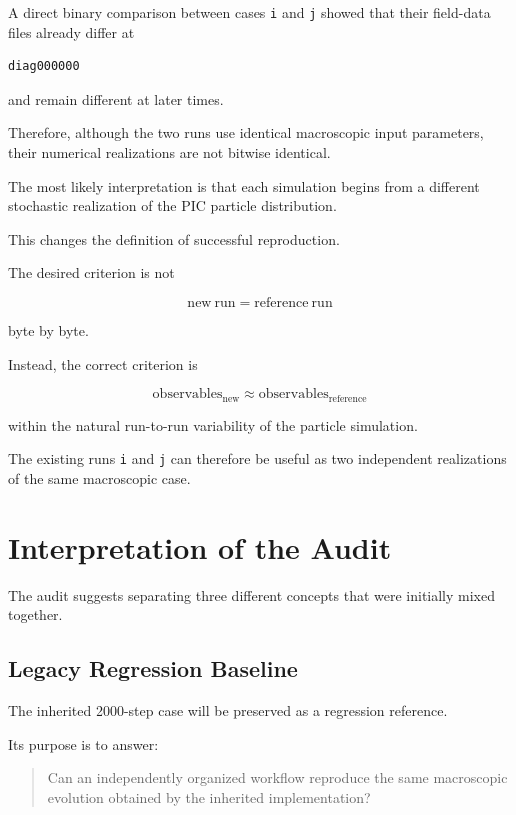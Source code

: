\documentclass[11pt,a4paper]{article}
\begin{document}
A direct binary comparison between cases \texttt{i} and \texttt{j} showed that their field-data files already differ at

\begin{lstlisting}
diag000000
\end{lstlisting}

and remain different at later times.

Therefore, although the two runs use identical macroscopic input parameters, their numerical realizations are not bitwise identical.

The most likely interpretation is that each simulation begins from a different stochastic realization of the PIC particle distribution.

This changes the definition of successful reproduction.

The desired criterion is not

\[
\mathrm{new\ run}
=
\mathrm{reference\ run}
\]

byte by byte.

Instead, the correct criterion is

\[
\mathrm{observables}_{\mathrm{new}}
\approx
\mathrm{observables}_{\mathrm{reference}}
\]

within the natural run-to-run variability of the particle simulation.

The existing runs \texttt{i} and \texttt{j} can therefore be useful as two independent realizations of the same macroscopic case.

\section{Interpretation of the Audit}

The audit suggests separating three different concepts that were initially mixed together.

\subsection{Legacy Regression Baseline}

The inherited 2000-step case will be preserved as a regression reference.

Its purpose is to answer:

\begin{quote}
Can an independently organized workflow reproduce the same macroscopic evolution obtained by the inherited implementation?
\end{quote}
\end{document}
